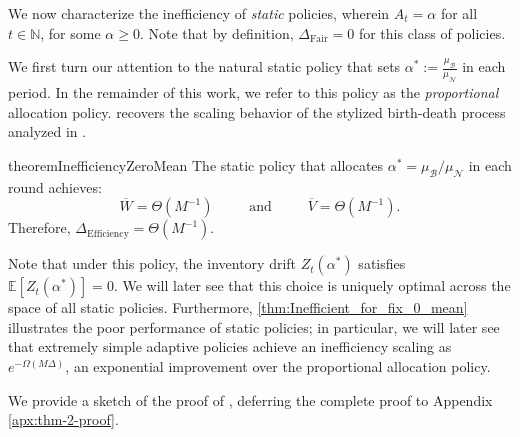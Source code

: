 \documentclass[mnsc,nonblindrev]{informs3}
\newcommand{\NDist}{\mathcal{N}}
\newcommand{\BDist}{\mathcal{B}}
\newcommand{\Nmean}{\mu_{\NDist}}
\newcommand{\Bmean}{\mu_{\BDist}}
\newcommand{\Exp}[1]{\mathbb{E} \left[ #1 \right]} %
\newcommand{\Deff}{\Delta_{\text{Efficiency}}\xspace}
\newcommand{\Dfair}{\Delta_{\text{Fair}}\xspace}
\begin{document}
We now characterize the inefficiency of {\it static} policies, wherein $A_t=\alpha$ for all $t \in \mathbb{N}$, for some $\alpha \geq 0$. Note that by definition, $\Dfair = 0$ for this class of policies.


We first turn our attention to the natural static policy that sets $\alpha^* := \frac{\mu_{\BDist}}{\mu_{\NDist}}$ in each period. In the remainder of this work, we refer to this policy as the {\it proportional} allocation policy.  recovers the scaling behavior of the stylized birth-death process analyzed in . 


\begin{restatable}{theorem}{InefficiencyZeroMean} \label{thm:Inefficient_for_fix_0_mean}
The static policy that allocates $\alpha^* = \Bmean / \Nmean$ in each round {achieves}: $$\overline{W} = \Theta(M^{-1}) \;\;\;\;\;\;\;\; \text{ and } \;\;\;\;\;\;\;\; \overline{V} = \Theta(M^{-1}).$$
    Therefore, $\Deff = \Theta(M^{-1})$.
\end{restatable}

Note that under this policy, the inventory drift $Z_t(\alpha^*)$ satisfies $\Exp{Z_t(\alpha^*)} = 0$. We will later see that this choice is uniquely optimal across the space of all static policies. Furthermore, \cref{thm:Inefficient_for_fix_0_mean} illustrates the poor performance of static policies; in particular, we will later see that extremely simple adaptive policies achieve an inefficiency scaling as $e^{-\Omega(M \Delta)}$, an exponential improvement over the proportional allocation policy.

We provide a sketch of the proof of , deferring the complete proof to Appendix \ref{apx:thm-2-proof}.
\end{document}
